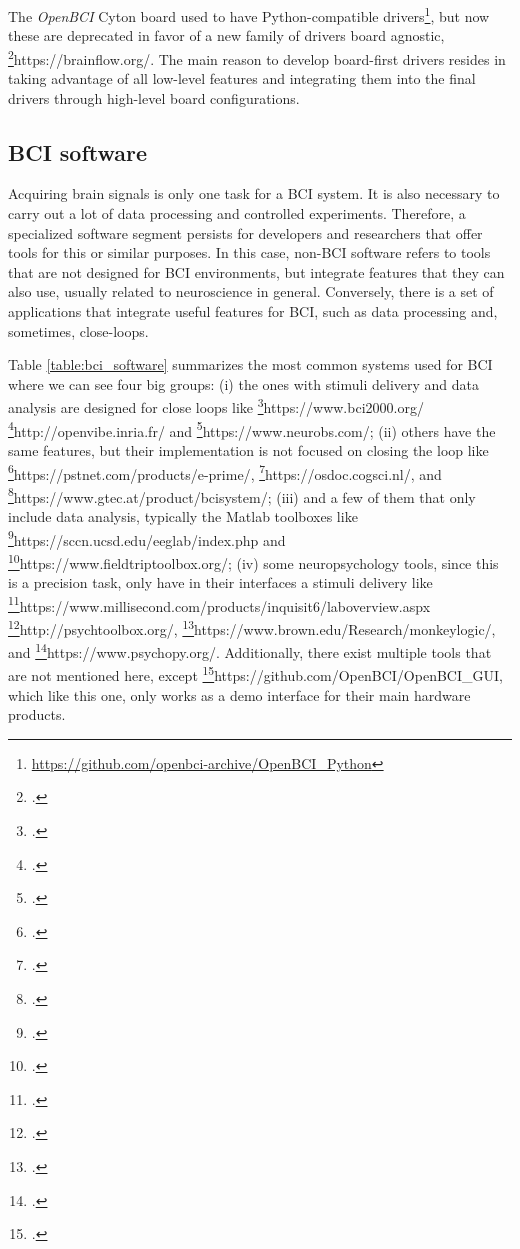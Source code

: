 The \textit{OpenBCI} Cyton board used to have Python-compatible drivers\footnote{\href{https://github.com/openbci-archive/OpenBCI_Python}{https://github.com/openbci-archive/OpenBCI\_Python}}, but now these are deprecated in favor of a new family of drivers board agnostic, \footcite{BrainFlow}{https://brainflow.org/}. The main reason to develop board-first drivers resides in taking advantage of all low-level features and integrating them into the final drivers through high-level board configurations. 



\subsection{BCI software}

Acquiring brain signals is only one task for a \gls*{BCI} system. It is also necessary to carry out a lot of data processing and controlled experiments. Therefore, a specialized software segment persists for developers and researchers that offer tools for this or similar purposes. In this case, non-\gls*{BCI} software refers to tools that are not designed for \gls*{BCI} environments, but integrate features that they can also use, usually related to neuroscience in general. Conversely, there is a set of applications that integrate useful features for \gls*{BCI}, such as data processing and, sometimes, close-loops.

Table \ref{table:bci_software} summarizes the most common systems used for \gls*{BCI} where we can see four big groups: 
(i) the ones with stimuli delivery and data analysis are designed for close loops like \footcite{BCI2000}{https://www.bci2000.org/} \footcite{OpenViBE}{http://openvibe.inria.fr/} and \footcite{Neurobehavioral Systems Presentation}{https://www.neurobs.com/};
(ii) others have the same features, but their implementation is not focused on closing the loop like \footcite{ePrime}{https://pstnet.com/products/e-prime/}, \footcite{OpenSesame}{https://osdoc.cogsci.nl/}, and \footcite{g.BCISYS}{https://www.gtec.at/product/bcisystem/};
(iii) and a few of them that only include data analysis, typically the Matlab toolboxes like \footcite{EEGLAB}{https://sccn.ucsd.edu/eeglab/index.php} and \footcite{FieldTrip}{https://www.fieldtriptoolbox.org/};
(iv) some neuropsychology tools, since this is a precision task, only have in their interfaces a stimuli delivery like \footcite{Millisecond Inquisit Lab}{https://www.millisecond.com/products/inquisit6/laboverview.aspx} \footcite{Pychotoolbox-3}{http://psychtoolbox.org/}, \footcite{MonkeyLogic}{https://www.brown.edu/Research/monkeylogic/}, and \footcite{PychoPy}{https://www.psychopy.org/}. Additionally, there exist multiple tools that are not mentioned here, except \footcite{OpenBCI GUI}{https://github.com/OpenBCI/OpenBCI_GUI}, which like this one, only works as a demo interface for their main hardware products.

